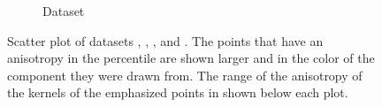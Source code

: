 \begin{figure}
\begin{subfigure}{0.23\textwidth}
			\caption{Dataset \baakmanThree}
			\label{fig:discussion:anisotropy:baakman3}
		\end{subfigure}			
		\caption{Scatter plot of datasets
			 \ferdosiTwo, %
			 \baakmanTwo, %
			 \ferdosiThree, and %
			 \baakmanThree. %
			The points that have an anisotropy in the  percentile are shown larger and in the color of the component they were drawn from. The range of the anisotropy of the kernels of the emphasized points in shown below each plot.}
		\label{fig:discussion:anisotropy:multisphere}
	\end{figure}	